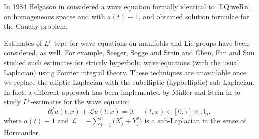 \documentclass[12pt,oneside,a4paper]{book}
\numberwithin{equation}{section}     %
\theoremstyle{plain}
\theoremstyle{definition}
\newcommand{\slp}{{\mathcal L}}
\begin{document}
In 1984 Helgason in \cite{Helgason:wave-eqns-hom-spaces-1984} considered a wave equation formally identical to \eqref{EQ:weRn} on homogeneous spaces and with $a(t)\equiv 1$, and obtained solution formulae for the Cauchy problem. 

Estimates of $L^p$-type for wave equations on manifolds and Lie groups have been considered, as well. For example, Seeger, Sogge and Stein \cite{SSS1991} and Chen, Fan and Sun \cite{CFS2010}  studied such estimates for strictly hyperbolic wave equations (with the usual Laplacian) using Fourier integral theory. These techniques are unavailable once we replace the elliptic Laplacian with the subelliptic (hypoelliptic) sub-Laplacian. In fact, a different approach has been implemented by M\"uller and Stein in \cite{Muller-Stein:Lp-wave-Heis} to study $L^p$-estimates for the wave equation
\begin{equation*}
\partial ^2_{t}u(t,x)+\slp u(t,x)=0,	\quad		(t,x)\in [0,\tau]\times\mathbb{H}_n,
\end{equation*}  
where $a(t)\equiv 1$ and $\slp=-\sum_{j=1}^n\big(X_j^2+Y_j^2\big)$ is a sub-Laplacian in the sense of H\"ormander. 
\end{document}
